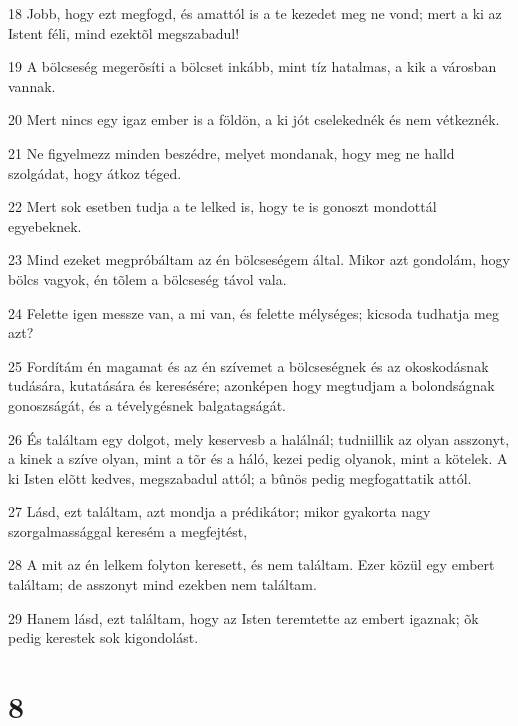 \par 18 Jobb, hogy ezt megfogd, és amattól is a te kezedet meg ne vond; mert a ki az Istent féli, mind ezektõl megszabadul!
\par 19 A bölcseség megerõsíti a bölcset inkább, mint tíz hatalmas, a kik a városban vannak.
\par 20 Mert nincs egy igaz ember is a földön, a ki jót cselekednék és nem vétkeznék.
\par 21 Ne figyelmezz minden beszédre, melyet mondanak, hogy meg ne halld szolgádat, hogy átkoz téged.
\par 22 Mert sok esetben tudja a te lelked is, hogy te is gonoszt mondottál egyebeknek.
\par 23 Mind ezeket megpróbáltam az én bölcseségem által. Mikor azt gondolám, hogy bölcs vagyok, én tõlem a bölcseség távol vala.
\par 24 Felette igen messze van, a mi van, és felette mélységes; kicsoda tudhatja meg azt?
\par 25 Fordítám én magamat és az én szívemet a bölcseségnek és az okoskodásnak tudására, kutatására és keresésére; azonképen hogy megtudjam a bolondságnak gonoszságát, és a tévelygésnek balgatagságát.
\par 26 És találtam egy dolgot, mely keservesb a halálnál; tudniillik az olyan asszonyt, a kinek a szíve olyan, mint a tõr és a háló, kezei pedig olyanok, mint a kötelek. A ki Isten elõtt kedves, megszabadul attól; a bûnös pedig megfogattatik attól.
\par 27 Lásd, ezt találtam, azt mondja a prédikátor; mikor gyakorta nagy szorgalmassággal keresém a megfejtést,
\par 28 A mit az én lelkem folyton keresett, és nem találtam. Ezer közül egy embert találtam; de asszonyt mind ezekben nem találtam.
\par 29 Hanem lásd, ezt találtam, hogy az Isten teremtette az embert igaznak; õk pedig kerestek sok kigondolást.

\chapter{8}


